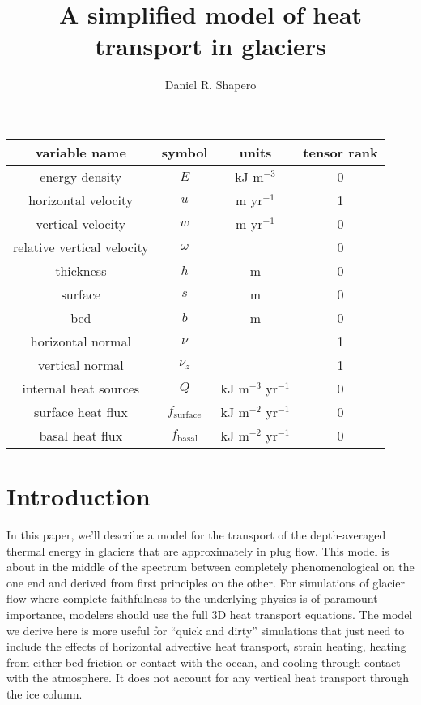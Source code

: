 \documentclass{article}
\title{A simplified model of heat transport in glaciers}
\author{Daniel R. Shapero}
\date{}
\theoremstyle{definition}
\theoremstyle{plain}
\begin{document}
\maketitle

\begin{center}
\begin{tabular}{|c|c|c|c|}
    \hline
    variable name & symbol & units & tensor rank \\
    \hline
    energy density & $E$ & kJ m${}^{-3}$ & 0 \\
    horizontal velocity & $u$ & m yr${}^{-1}$ & 1 \\
    vertical velocity & $w$ & m yr${}^{-1}$ & 0 \\
    relative vertical velocity & $\omega$ & & 0 \\
    thickness & $h$ & m & 0 \\
    surface & $s$ & m & 0 \\
    bed & $b$ & m & 0 \\
    horizontal normal & $\nu$ & & 1 \\
    vertical normal & $\nu_z$ & & 1 \\
    internal heat sources & $Q$ & kJ m${}^{-3}$ yr${}^{-1}$ & 0 \\
    surface heat flux & $f_{\text{surface}}$ & kJ m${}^{-2}$ yr${}^{-1}$ & 0 \\
    basal heat flux & $f_{\text{basal}}$ & kJ m${}^{-2}$ yr${}^{-1}$ & 0 \\
    \hline
\end{tabular}
\end{center}


\section{Introduction}

In this paper, we'll describe a model for the transport of the depth-averaged thermal energy in glaciers that are approximately in plug flow.
This model is about in the middle of the spectrum between completely phenomenological on the one end and derived from first principles on the other.
For simulations of glacier flow where complete faithfulness to the underlying physics is of paramount importance, modelers should use the full 3D heat transport equations.
The model we derive here is more useful for ``quick and dirty'' simulations that just need to include the effects of horizontal advective heat transport, strain heating, heating from either bed friction or contact with the ocean, and cooling through contact with the atmosphere.
It does not account for any vertical heat transport through the ice column.
\end{document}

